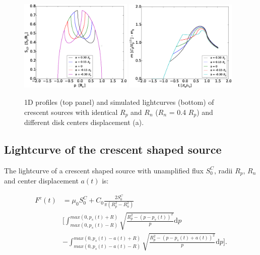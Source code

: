 \documentclass[usenatbib]{mn2e}
\begin{document}
\begin{figure}
\centering
    \includegraphics[width = 0.48\textwidth]{figures/S1D_var_a.eps}
    \includegraphics[width = 0.48\textwidth]{figures/4avar_magnification.eps}
\caption{\label{fig:a_var} 1D profiles (top panel) and simulated lightcurves 
(bottom) of crescent sources with identical $R_p$ and $R_n$ ($R_n$ = 0.4 $R_p$) and different disk centers displacement (a).}
\end{figure}


\subsection{Lightcurve of the crescent shaped source}

The lightcurve of a crescent shaped source with unamplified flux $S_0^C$, radii $R_p$, $R_n$ and center displacement $a(t)$ is:


\begin{equation}
\begin{aligned}
 F^c(t) &= \mu_0 S_0^C + C_0 \frac{2 S_0^C}{\pi \left( R_p^2 -R_n^2 \right) } \\
    &\bigg[ \int_{max(0, p_s(t) - R)}^{max(0, p_s(t) + R)} \sqrt{\frac{R_p^2 - \left( p-p_s(t) \right)^2 }{p}} \mathrm{d}p \\
    &  -  \int_{max(0, p_s(t) - a(t) - R)}^{max(0, p_s(t) -a(t) + R)} \sqrt{\frac{R_p^2 - \left( p-p_s(t) +a(t) \right)^2 }{p}} \mathrm{d}p  \bigg] .
\end{aligned}
\end{equation}
\end{document}

